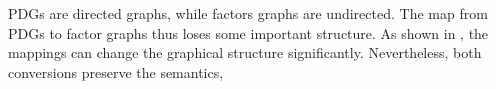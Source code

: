 \documentclass[letterpaper]{article} %
\theoremstyle{plain}
\theoremstyle{definition}
\theoremstyle{remark}
\newcommand{\begthm}[3][]{\begin{#2}[{name=#1},restate=#3,label=#3]}
\newcommand\vfull[1]{{\color{vfullcolor} #1}}
\renewcommand\vfull[1]{} %
\newcommand{\commentout}[1]{\ignorespaces}
\newcommand{\dg}[1]{\mathbdcal{#1}}
\newcommand{\PDGof}[1]{{\dg M}_{#1}}
\newcommand{\UPDGof}[1]{{\dg N}_{#1}}
\begin{document}
PDGs are directed graphs, while factors graphs are undirected. The
map from PDGs to factor graphs thus loses some important structure.
As shown in
\vfull{
    \Cref{fig:fg2PDG,fig:fg-intro-examples}
}%
,
the mappings can change the graphical structure significantly.
Nevertheless, 
both conversions preserve the semantics, 



\commentout{
	\begthm{prop}{prop:fg-pdg-lossless}
	Given an unweighted FG $\Phi$, $\Phi_{\UPDGof{\Phi}} = \Phi$ 
	\end{prop}
}
\end{document}
